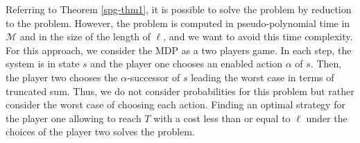 Referring to Theorem \ref{spg-thm1}, it is possible to solve the \SPG{} problem by reduction to the \SSPP{} problem.
However, the \SSPP{} problem is computed in pseudo-polynomial time in $\mathcal{M}$ and in the size of the length of $\ell$, and we want to avoid this time complexity.
For this approach, we consider the MDP as a two players game.
In each step, the system is in state $s$ and the player one chooses an enabled action $\alpha$ of $s$.
Then, the player two chooses the $\alpha$-successor of $s$ leading the worst case in terms of truncated sum.
Thus, we do not consider probabilities for this problem but rather consider the worst case of choosing each action.
Finding an optimal strategy for the player one allowing to reach $T$ with a cost less than or equal to $\ell$
under the choices of the player two solves the \SPG{} problem. \\


